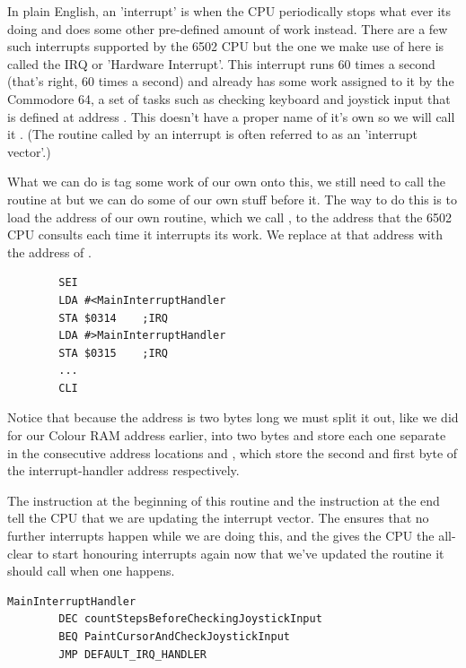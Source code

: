 {In plain English, an 'interrupt' is when the CPU periodically stops what ever its doing and does some other pre-defined amount
of work instead. There are a few such interrupts supported by the 6502 CPU but the one we make use of here is called the IRQ
or 'Hardware Interrupt'. This interrupt runs 60 times a second (that's right, 60 times a second) and already has some work
assigned to it by the Commodore 64, a set of tasks such as checking keyboard and joystick input that is defined at address .
This doesn't have a proper name of it's own so we will call it . (The routine called by an interrupt
is often referred to as an 'interrupt vector'.)

What we can do is tag some work of our own onto this, we still need to call the routine at  but we can do some of our
own stuff before it. The way to do this is to load the address of our own routine, which we call , to
the address that the 6502 CPU consults each time it interrupts its work. We replace  at that address with the address
of .  
\begin{lstlisting}
        SEI 
        LDA #<MainInterruptHandler
        STA $0314    ;IRQ
        LDA #>MainInterruptHandler
        STA $0315    ;IRQ
        ...
        CLI 
\end{lstlisting}

Notice that because the address is two bytes long we must split it out, like we did for our Colour RAM address earlier, into 
two bytes and store each one separate in the consecutive address locations  and , which store
the second and first byte of the interrupt-handler address respectively. 

The  instruction at the beginning of this routine and the  instruction at the end tell the CPU that we 
are updating the interrupt vector. The  ensures that no further interrupts happen while we are doing this, and the
 gives the CPU the all-clear to start honouring interrupts again now that we've updated the routine it should call
when one happens.


\clearpage
\begin{lstlisting}[caption= This is our interrupt handler\, it runs 60 times a second so has to be fast.]
MainInterruptHandler   
        DEC countStepsBeforeCheckingJoystickInput
        BEQ PaintCursorAndCheckJoystickInput
        JMP DEFAULT_IRQ_HANDLER


\end{lstlisting}}

